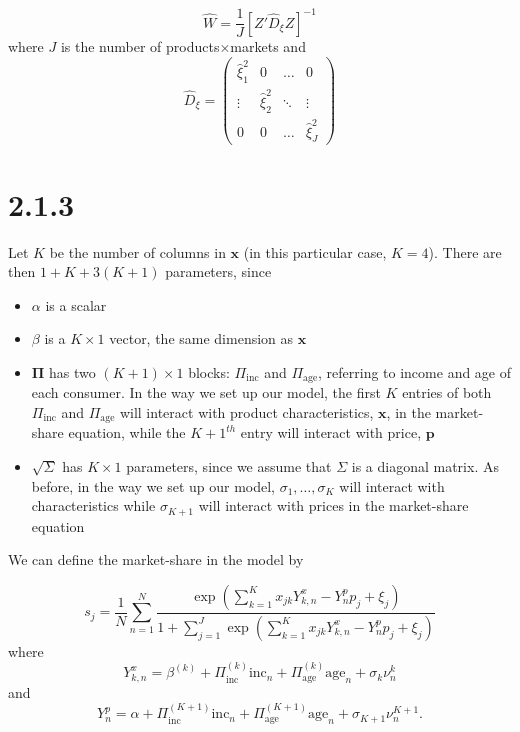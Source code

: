 \documentclass[a4paper,11pt]{article}
\begin{document}
\[\hat W = \frac{1}{J}\left[Z'\hat{D}_{\xi}Z\right]^{-1} \]where $J$ is the number of products$\times$markets and 
\[ \hat{D}_{\xi} = \left(\begin{array}{cccc}
\hat\xi_1^2 & 0 & \ldots & 0 \\
\vdots & \hat\xi_2^2 & \ddots & \vdots \\
0 & 0 & \ldots & \hat\xi_J^2
\end{array} \right) \]


\section*{2.1.3}
Let $K$ be the number of columns in $\mathbf{x}$ (in this particular case, $K = 4$). There are then $1 + K + 3(K+1)$ parameters, since
\begin{itemize}
\item $\alpha$ is a scalar
\item $\beta$ is a $K \times 1$ vector, the same dimension as $\mathbf{x}$
\item $\mathbf{\Pi}$ has two $(K+1) \times 1$ blocks: $\Pi_{\mathrm{inc}}$ and $\Pi_{\mathrm{age}}$, referring to income and age of each consumer. In the way we set up our model, the first $K$ entries of both $\Pi_{\mathrm{inc}}$ and $\Pi_{\mathrm{age}}$ will interact with product characteristics, $\mathbf{x}$, in the market-share equation, while the $K+1^{th}$ entry will interact with price, $\mathbf{p}$
\item $\sqrt{\Sigma}$ has $K\times 1$ parameters, since we assume that $\Sigma$ is a diagonal matrix. As before, in the way we set up our model, $\sigma_{1}, \ldots, \sigma_{K}$ will interact with characteristics while $\sigma_{K+1}$ will interact with prices in the market-share equation
\end{itemize}

We can define the market-share in the model by

\[ s_j = \frac{1}{N}\sum_{n=1}^N \frac{\exp\left(\sum_{k=1}^K
x_{jk}Y^x_{k,n} - Y^p_{n}p_j + \xi_j \right)}{ 1 + \sum_{j = 1}^J\exp\left(\sum_{k=1}^K x_{jk}Y^x_{k,n} - Y^p_{n}p_j + \xi_j \right)} \]
where
\[ Y^x_{k,n} = \beta^{(k)} + \Pi_{\mathrm{inc}}^{(k)}\mathrm{inc}_n + \Pi_{\mathrm{age}}^{(k)}\mathrm{age}_n + \sigma_k \nu_n^k\]
and
\[ Y^p_{n} = \alpha + \Pi_{\mathrm{inc}}^{(K+1)}\mathrm{inc}_n + \Pi_{\mathrm{age}}^{(K+1)}\mathrm{age}_n + \sigma_{K+1}\nu_n^{K+1}. \]
\end{document}
